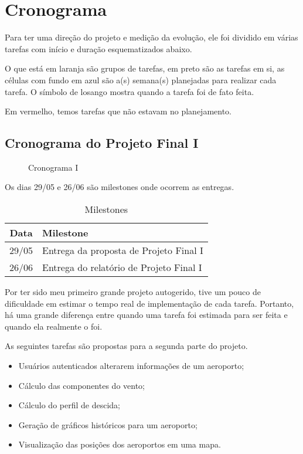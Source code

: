 \chapter{Cronograma}

Para ter uma direção do projeto e medição da evolução, ele foi dividido em várias 
tarefas com início e duração esquematizados abaixo.

O que está em laranja são grupos de tarefas, em preto são as tarefas em si, as 
células com fundo em azul são a(s) semana(s) planejadas para realizar cada tarefa. 
O símbolo de losango mostra quando a tarefa foi de fato feita.

Em vermelho, temos tarefas que não estavam no planejamento.

\section{Cronograma do Projeto Final I}

\begin{figure}[ht]
    \begin{center}
    
    \caption{Cronograma I}
    \label{fig:cronograma-planejado-I}
    \end{center}
\end{figure}

Os dias 29/05 e 26/06 são milestones onde ocorrem as entregas.

\begin{table}[h]
    \centering
    \caption{Milestones}
    \begin{tabular}{|c|l|}
        \hline
        \textbf{Data} & \textbf{Milestone} \\
        \hline
        29/05 & Entrega da proposta de Projeto Final I \\
        26/06 & Entrega do relatório de Projeto Final I \\
        \hline
    \end{tabular}
\end{table}

Por ter sido meu primeiro grande projeto autogerido, tive um pouco de dificuldade 
em estimar o tempo real de implementação de cada tarefa. Portanto, há uma grande 
diferença entre quando uma tarefa foi estimada para ser feita e quando ela realmente 
o foi.

As seguintes tarefas são propostas para a segunda parte do projeto.

\begin{itemize}
    \item Usuários autenticados alterarem informações de um aeroporto;
    \item Cálculo das componentes do vento;
    \item Cálculo do perfil de descida;
    \item Geração de gráficos históricos para um aeroporto;
    \item Visualização das posições dos aeroportos em uma mapa.
\end{itemize}

